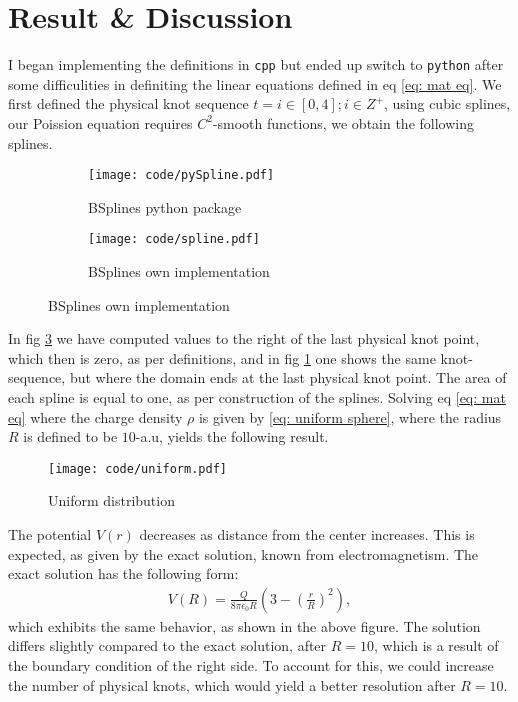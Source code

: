 \documentclass[a4paper]{article}
\begin{document}
\section{Result \& Discussion}
I began implementing the definitions in \verb|cpp| but ended up switch to \verb|python| after some difficulities in definiting the linear equations defined in eq \eqref{eq: mat eq}.
We first defined the physical knot sequence $t = {i\in[0, 4]; i \in Z^+}$, using cubic splines, our Poission equation requires $C^2$-smooth functions, we obtain the following splines.
\begin{figure}[H]
    \centering
    \begin{subfigure}{0.45\textwidth}
        \texttt{[image: code/pySpline.pdf]}
        \caption{BSplines python package}
        \label{fig: basis functions py}
    \end{subfigure}
    \hfill
    \begin{subfigure}{0.45\textwidth}
        \texttt{[image: code/spline.pdf]}
        \caption{BSplines own implementation}
        \label{fig: basis functions own}
    \end{subfigure}
\end{figure}\noindent
In fig \ref{fig: basis functions own} we have computed values to the right of the last physical knot point, which then is zero, as per definitions, and in fig \ref{fig: basis functions py} one shows the same knot-sequence, but where the domain ends at the last physical knot point.
The area of each spline is equal to one, as per construction of the splines.
Solving eq \eqref{eq: mat eq} where the charge density $\rho$ is given by \eqref{eq: uniform sphere}, where the radius $R$ is defined to be $10$-a.u, yields the following result.

\begin{figure}[H]
    \centering
    \texttt{[image: code/uniform.pdf]}
    \caption{Uniform distribution}
    \label{fig: uniform distribution}
\end{figure}\noindent
The potential $V(r)$ decreases as distance from the center increases.
This is expected, as given by the exact solution, known from electromagnetism.
The exact solution has the following form:
\begin{align*}
    V(R) = \frac{Q}{8\pi\epsilon_0R}\left(3 - \left(\frac{r}{R}\right)^2\right),
\end{align*}which exhibits the same behavior, as shown in the above figure.
The solution differs slightly compared to the exact solution, after $R = 10$, which is a result of the boundary condition of the right side.
To account for this, we could increase the number of physical knots, which would yield a better resolution after $R = 10$.
\end{document}
